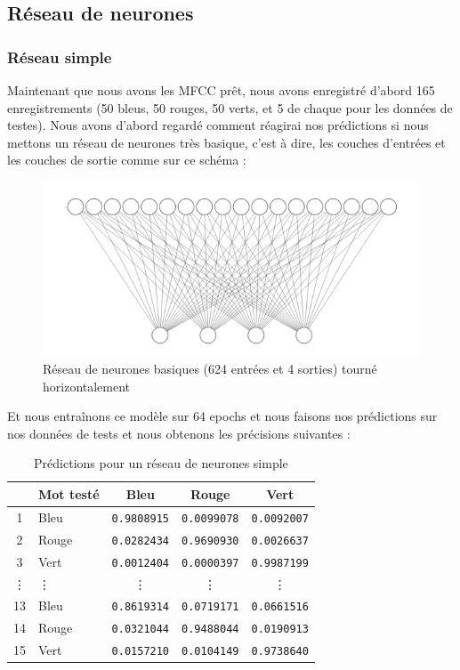 \documentclass[a4paper,11pt]{article}
\begin{document}
\subsection{Réseau de neurones} \label{neuralnetworks}
\subsubsection{Réseau simple}\label{test:simple}
Maintenant que nous avons les MFCC prêt, nous avons enregistré d'abord 165 enregistrements (50 bleus, 50 rouges, 50 verts, et 5 de chaque pour les données de testes). Nous avons d'abord regardé comment réagirai nos prédictions si nous mettons un réseau de neurones très basique, c'est à dire, les couches d'entrées et les couches de sortie comme sur ce schéma : 
\begin{figure}[H]
\centering
\includegraphics[scale=0.6]{images/cnn6.png}
\caption{Réseau de neurones basiques (624 entrées et 4 sorties) tourné horizontalement}\label{fig:simple}
\end{figure}
Et nous entraînons ce modèle sur 64 epochs et nous faisons nos prédictions sur nos données de tests et nous obtenons les précisions suivantes : 
\begin{table}[H]
\centering
\begin{tabular}{clccc}
\toprule
& \textbf{Mot testé} & \textbf{Bleu} & \textbf{Rouge} & \textbf{Vert} \\
\midrule
1 & Bleu & \texttt{0.9808915} & \texttt{0.0099078} & \texttt{0.0092007} \\
2 & Rouge & \texttt{0.0282434} & \texttt{0.9690930} & \texttt{0.0026637} \\
3 & Vert & \texttt{0.0012404} & \texttt{0.0000397} & \texttt{0.9987199} \\
\vdots & \vdots & \vdots & \vdots & \vdots \\
13 & Bleu & \texttt{0.8619314} & \texttt{0.0719171} & \texttt{0.0661516} \\
14 & Rouge & \texttt{0.0321044} & \texttt{0.9488044} & \texttt{0.0190913} \\
15 & Vert & \texttt{0.0157210} & \texttt{0.0104149} & \texttt{0.9738640} \\
\bottomrule
\end{tabular}
\caption{Prédictions pour un réseau de neurones simple}
\end{table}
\end{document}
